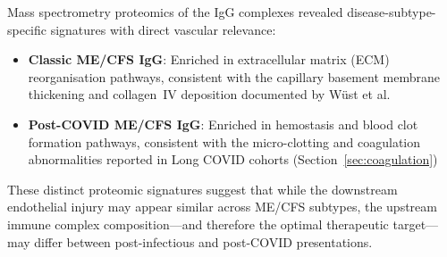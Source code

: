 Mass spectrometry proteomics of the IgG complexes revealed disease-subtype-specific signatures with direct vascular relevance:

\begin{itemize}
    \item \textbf{Classic ME/CFS IgG}: Enriched in extracellular matrix (ECM) reorganisation pathways, consistent with the capillary basement membrane thickening and collagen~IV deposition documented by W\"ust et al.~\cite{Wust2024capillary}
    \item \textbf{Post-COVID ME/CFS IgG}: Enriched in hemostasis and blood clot formation pathways, consistent with the micro-clotting and coagulation abnormalities reported in Long COVID cohorts (Section~\ref{sec:coagulation})
\end{itemize}

These distinct proteomic signatures suggest that while the downstream endothelial injury may appear similar across ME/CFS subtypes, the upstream immune complex composition---and therefore the optimal therapeutic target---may differ between post-infectious and post-COVID presentations.


